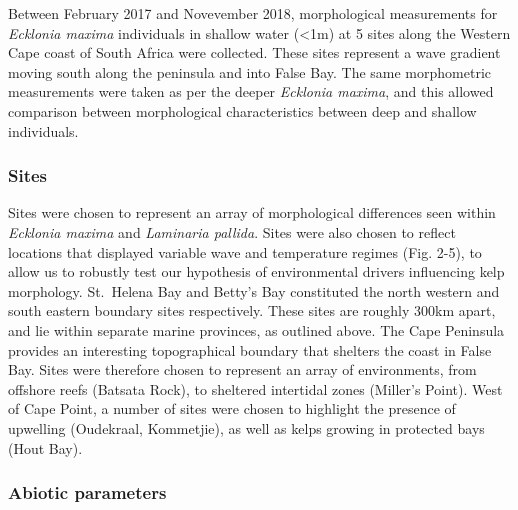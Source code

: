 \documentclass[10pt,a4,]{article}
\begin{document}
Between February 2017 and Novevember 2018, morphological measurements
for \emph{Ecklonia maxima} individuals in shallow water (\textless{}1m)
at 5 sites along the Western Cape coast of South Africa were collected.
These sites represent a wave gradient moving south along the peninsula
and into False Bay. The same morphometric measurements were taken as per
the deeper \emph{Ecklonia maxima}, and this allowed comparison between
morphological characteristics between deep and shallow individuals.

\hypertarget{sites}{%
\subsubsection{Sites}\label{sites}}

Sites were chosen to represent an array of morphological differences
seen within \emph{Ecklonia maxima} and \emph{Laminaria pallida}. Sites
were also chosen to reflect locations that displayed variable wave and
temperature regimes (Fig. 2-5), to allow us to robustly test our
hypothesis of environmental drivers influencing kelp morphology.
St.~Helena Bay and Betty's Bay constituted the north western and south
eastern boundary sites respectively. These sites are roughly 300km
apart, and lie within separate marine provinces, as outlined above. The
Cape Peninsula provides an interesting topographical boundary that
shelters the coast in False Bay. Sites were therefore chosen to
represent an array of environments, from offshore reefs (Batsata Rock),
to sheltered intertidal zones (Miller's Point). West of Cape Point, a
number of sites were chosen to highlight the presence of upwelling
(Oudekraal, Kommetjie), as well as kelps growing in protected bays (Hout
Bay).

\hypertarget{abiotic-parameters}{%
\subsubsection{Abiotic parameters}\label{abiotic-parameters}}
\end{document}
